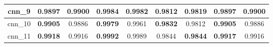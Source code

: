 \begin{table}[p]
\begin{tabular} {|c|c|c|c|c|c|c|c|c| }
        cnn\_9   & 0.9897                        & \textbf{0.9900}                     & \textbf{0.9984}                & 0.9982                         & 0.9812                     & \textbf{0.9819}                     & 0.9897                     & \textbf{0.9900}                     \\ \hline
        cnn\_10  & \textbf{0.9905}               & 0.9886                              & \textbf{0.9979}                & 0.9961                         & \textbf{0.9832}            & 0.9812                              & \textbf{0.9905}            & 0.9886                              \\ \hline
        cnn\_11  & \textbf{0.9918}               & 0.9916                              & \textbf{0.9992}                & 0.9989                         & 0.9844                     & \textbf{0.9844}                     & \textbf{0.9917}            & 0.9916                              \\ \hline
    \end{tabular}
\end{table}



